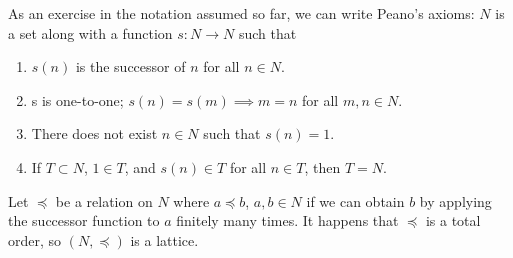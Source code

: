 
As an exercise in the notation assumed so far, we can write Peano's axioms: $N$ is a set along with a function $s: N \to N$ such that
\begin{enumerate}
  \item $s(n)$ is the successor of $n$ for all $n \in N$.
  \item s is one-to-one; $s(n) = s(m) \implies m = n$  for all $m, n \in N$.
  \item There does not exist $n \in N$ such that $s(n) = 1$.
  \item If $T \subset N$, $1 \in T$, and $s(n) \in T$ for all $n \in T$, then $T = N$.
\end{enumerate}


Let $\preceq$ be a relation on $N$ where $a \preceq b$, $a, b \in N$ if we can obtain $b$ by applying the successor function to $a$ finitely many times.
It happens that $\preceq$ is a total order, so $(N, \preceq)$ is a lattice.
